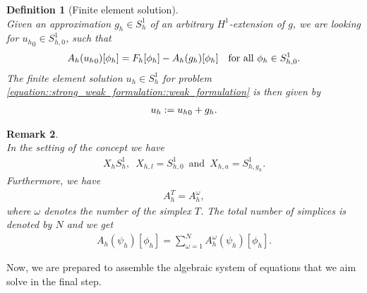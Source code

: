 \documentclass[a4paper,11pt]{article}
\numberwithin{equation}{section}
\newtheorem{definition}{Definition}[section]
\newtheorem{remark}[definition]{Remark}
\newcommand{\theoremNewline}{\hspace{1mm}\\}
\newcommand{\theoremEndLine}{\hspace{1mm}}
\newcommand{\punkt}{\text{.}}
\begin{document}
\begin{definition}[Finite element solution]
\label{definition::discretization::finite_element_solution}
\theoremNewline
Given an approximation ${g_h \in S_h^1}$ of an arbitrary $H^1$-extension of $g$, we are looking for
${{u_h}_0 \in {S_{h,0}^{1}}}$, such that
\begin{align}
A_h({u_h}_0)[\phi_h] = F_h[\phi_h] - A_h(g_h)[\phi_h] &&\text{for all } \phi_h \in {S_{h,0}^{1}} \punkt
\notag
\end{align}
The finite element solution $u_h \in S_{h}^{1} $ for problem \ref{equation::strong_weak_formulation::weak_formulation} is then given by
\begin{align}
u_h := {u_h}_0 + g_h\punkt
\notag
\end{align}
\end{definition}\theoremEndLine


\begin{remark}\theoremNewline
In the setting of the concept we have
\begin{align*}
X_hS_{h}^{1}, \enspace X_{h,l}={S_{h,0}^{1}} \enspace \mbox{and} \enspace X_{h,a}={S_{h,g_h}^{1}}.
\end{align*}
Furthermore, we have
\begin{align*}
A_h^T = A_h^{\omega},
\end{align*}
where $\omega$ denotes the number of the simplex $T$. The total number of simplices is denoted by $N$ and we get
\begin{align*}
A_h(\psi_h)[\phi_h] = \sum_{\omega =1}^N A_h^{\omega}(\psi_h)[\phi_h].
\end{align*}
\end{remark}

Now, we are prepared to assemble the algebraic system of equations that we aim solve in the final step.
\end{document}
